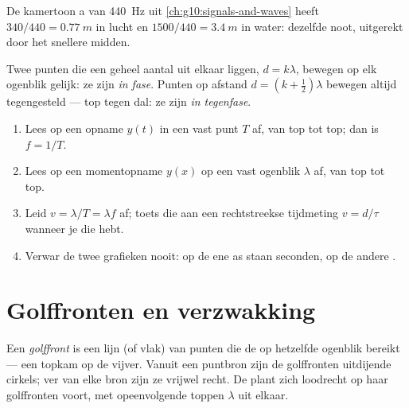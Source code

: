 \begin{example}\label{ex:g12:mechanical-waves:concertA}
De kamertoon a van \qty{440}{Hz} uit \cref{ch:g10:signals-and-waves} heeft
 $340/440 = \qty{0.77}{m}$ in lucht en
$1500/440 = \qty{3.4}{m}$ in water: dezelfde noot, uitgerekt door het
snellere midden.
\end{example}

\begin{definition}\label{def:g12:mechanical-waves:phase}
Twee punten die een geheel aantal  uit elkaar liggen,
$d = k\lambda$, bewegen op elk ogenblik gelijk: ze zijn \emph{in
fase}. Punten op afstand $d = (k + \tfrac12)\lambda$
bewegen altijd tegengesteld --- top tegen dal: ze zijn \emph{in
tegenfase}.
\end{definition}

\begin{method}\label{met:g12:mechanical-waves:reading}
\begin{enumerate}
  \item Lees op een opname $y(t)$ in een vast punt $T$ af, van top tot
        top; dan is $f = 1/T$.
  \item Lees op een momentopname $y(x)$ op een vast ogenblik $\lambda$ af,
        van top tot top.
  \item Leid $v = \lambda/T = \lambda f$ af; toets die aan een
        rechtstreekse tijdmeting $v = d/\tau$ wanneer je die hebt.
  \item Verwar de twee grafieken nooit: op de ene as staan seconden, op de
        andere .
\end{enumerate}
\end{method}

\section{Golffronten en verzwakking}

\begin{definition}[Golffront]\label{def:g12:mechanical-waves:wavefront}
Een \emph{golffront} is een lijn (of vlak) van punten die
de  op hetzelfde ogenblik bereikt --- een topkam op de vijver. Vanuit
een puntbron zijn de golffronten uitdijende cirkels; ver van elke bron
zijn ze vrijwel recht. De  plant zich loodrecht op haar golffronten
voort, met opeenvolgende toppen $\lambda$ uit elkaar.
\end{definition}

